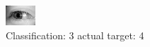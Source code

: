 \begin{figure}[h!]
\begin{center}
\includegraphics[width=0.60\columnwidth]{figures/ID3199_class_3_target_4.png}
\end{center}
\caption{ Classification: 3 actual target: 4}
\label{fig:ID3199_class_3_target_4}
\end{figure}
